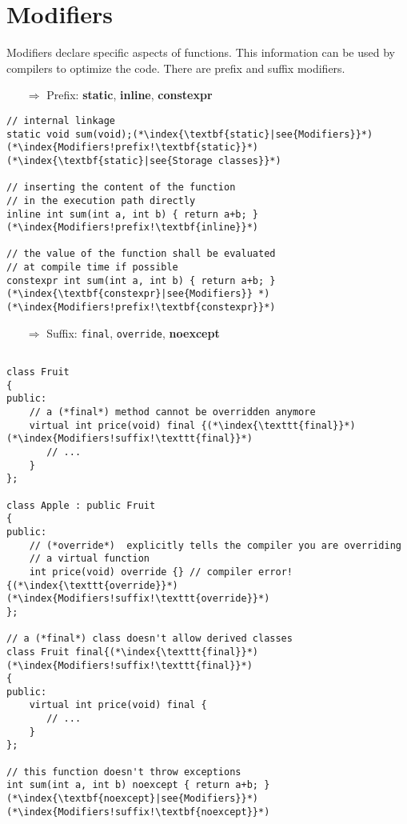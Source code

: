 \documentclass[10pt]{article}
\begin{document}
\section{Modifiers}
\small
Modifiers declare specific aspects of functions. This information can be used by compilers to optimize the code. There are prefix and suffix modifiers.
\begin{enumerate}
\item[$\Rightarrow$]  Prefix: \textbf{static}, \textbf{inline}, \textbf{constexpr}
\end{enumerate}
\begin{lstlisting}
// internal linkage
static void sum(void);(*\index{\textbf{static}|see{Modifiers}}*)(*\index{Modifiers!prefix!\textbf{static}}*)(*\index{\textbf{static}|see{Storage classes}}*)

// inserting the content of the function
// in the execution path directly
inline int sum(int a, int b) { return a+b; }(*\index{Modifiers!prefix!\textbf{inline}}*)

// the value of the function shall be evaluated
// at compile time if possible
constexpr int sum(int a, int b) { return a+b; }(*\index{\textbf{constexpr}|see{Modifiers}} *)(*\index{Modifiers!prefix!\textbf{constexpr}}*)
\end{lstlisting}
\begin{enumerate}
\item[$\Rightarrow$]  Suffix: \texttt{final}, \texttt{override}, \textbf{noexcept}
\end{enumerate}
\begin{lstlisting}

class Fruit
{
public:
    // a (*final*) method cannot be overridden anymore
    virtual int price(void) final {(*\index{\texttt{final}}*)(*\index{Modifiers!suffix!\texttt{final}}*)
       // ...
    }
};

class Apple : public Fruit
{
public:
    // (*override*)  explicitly tells the compiler you are overriding
    // a virtual function
    int price(void) override {} // compiler error!{(*\index{\texttt{override}}*)(*\index{Modifiers!suffix!\texttt{override}}*)
};

// a (*final*) class doesn't allow derived classes
class Fruit final{(*\index{\texttt{final}}*)(*\index{Modifiers!suffix!\texttt{final}}*)
{
public:
    virtual int price(void) final {
       // ...
    }
};

// this function doesn't throw exceptions
int sum(int a, int b) noexcept { return a+b; }(*\index{\textbf{noexcept}|see{Modifiers}}*)(*\index{Modifiers!suffix!\textbf{noexcept}}*)
\end{lstlisting}
%
%
\end{document}
